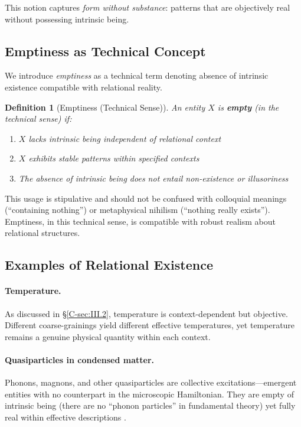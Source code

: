 \documentclass[12pt,a4paper,openany]{book}
\newtheorem{definition}[theorem]{Definition}
\begin{document}
This notion captures \emph{form without substance}: patterns that are objectively real without possessing intrinsic being.

\subsection{Emptiness as Technical Concept}
\label{C-sec:III.3}

We introduce \emph{emptiness} as a technical term denoting absence of intrinsic existence compatible with relational reality.

\begin{definition}[Emptiness (Technical Sense)]
\label{C-def:emptiness-technical}
An entity $X$ is \textbf{empty} (in the technical sense) if:
\begin{enumerate}
\item $X$ lacks intrinsic being independent of relational context
\item $X$ exhibits stable patterns within specified contexts
\item The absence of intrinsic being does not entail non-existence or illusoriness
\end{enumerate}
\end{definition}

This usage is stipulative and should not be confused with colloquial meanings (``containing nothing'') or metaphysical nihilism (``nothing really exists''). Emptiness, in this technical sense, is compatible with robust realism about relational structures.

\subsection{Examples of Relational Existence}
\label{C-sec:III.4}

\paragraph{Temperature.}
As discussed in \S\ref{C-sec:III.2}, temperature is context-dependent but objective. Different coarse-grainings yield different effective temperatures, yet temperature remains a genuine physical quantity within each context.

\paragraph{Quasiparticles in condensed matter.}
Phonons, magnons, and other quasiparticles are collective excitations—emergent entities with no counterpart in the microscopic Hamiltonian. They are empty of intrinsic being (there are no ``phonon particles'' in fundamental theory) yet fully real within effective descriptions \cite{Ladyman2007}.
\end{document}
